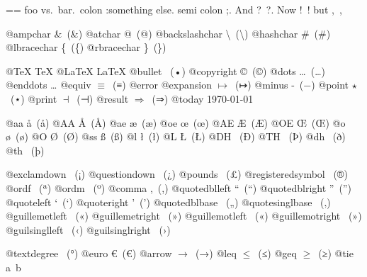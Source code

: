 \documentclass{book}
\makeatletter
\newenvironment{Texinfopreformatted}{%
  \par\GNUTobeylines\obeyspaces\frenchspacing\parskip=\z@\parindent=\z@}{}
{\catcode`\^^M=13 \gdef\GNUTobeylines{\catcode`\^^M=13 \def^^M{\null\par}}}
\newenvironment{Texinfoindented}{\begin{list}{}{}\item\relax}{\end{list}}
\renewcommand{\_}{\Texinfounderscore\discretionary{}{}{}}
\makeatother
\begin{document}
\begin{Texinfoindented}
\begin{Texinfopreformatted}
foo vs.\@\ bar.\ 
colon :\@And something else.
semi colon ;\@.
And ?\ ?\@.
Now !\ !\@@
but ,\ ,\@

@ampchar \&\ (\&)
@atchar @\ (@)
@backslashchar \textbackslash{}\ (\textbackslash{})
@hashchar \#\ (\#)
@lbracechar \{\ (\{)
@rbracechar \}\ (\})

@TeX \TeX{}
@LaTeX \LaTeX{}
@bullet \textbullet{}\ (•)
@copyright \copyright{}\ (©)
@dots \dots{}\@\ (…)
@enddots \dots{}
@equiv $\equiv{}$\ (≡)
@error 
@expansion $\mapsto{}$\ (↦)
@minus -\ (−)
@point $\star{}$\ (⋆)
@print $\dashv{}$\ (⊣)
@result $\Rightarrow{}$\ (⇒)
@today \today{}

@aa \aa{}\ (å)
@AA \AA{}\ (Å)
@ae \ae{}\ (æ)
@oe \oe{}\ (œ)
@AE \AE{}\ (Æ)
@OE \OE{}\ (Œ)
@o \o{}\ (ø)
@O \O{}\ (Ø)
@ss \ss{}\ (ß)
@l \l{}\ (ł)
@L \L{}\ (Ł)
@DH \DH{}\ (Ð)
@TH \TH{}\ (Þ)
@dh \dh{}\ (ð)
@th \th{}\ (þ)

@exclamdown \textexclamdown{}\ (¡)
@questiondown \textquestiondown{}\ (¿)
@pounds \textsterling{}\ (£)
@registeredsymbol \circledR{}\ (®)
@ordf \textordfeminine{}\ (ª)
@ordm \textordmasculine{}\ (º)
@comma ,\ (,)
@quotedblleft \textquotedblleft{}\ (“)
@quotedblright \textquotedblright{}\ (”)
@quoteleft \textquoteleft{}\ (‘)
@quoteright \textquoteright{}\ (’)
@quotedblbase \quotedblbase{}\ („)
@quotesinglbase \quotesinglbase{}\ (‚)
@guillemetleft \guillemotleft{}\ («)
@guillemetright \guillemotright{}\ (»)
@guillemotleft \guillemotleft{}\ («)
@guillemotright \guillemotright{}\ (»)
@guilsinglleft \guilsinglleft{}\ (‹)
@guilsinglright \guilsinglright{}\ (›)

@textdegree \textdegree{}\ (°)
@euro \euro{}\ (€)
@arrow $\rightarrow{}$\ (→)
@leq $\leq{}$\ (≤)
@geq $\geq{}$\ (≥)
@tie a~b


\end{Texinfopreformatted}
\end{Texinfoindented}
\end{document}
